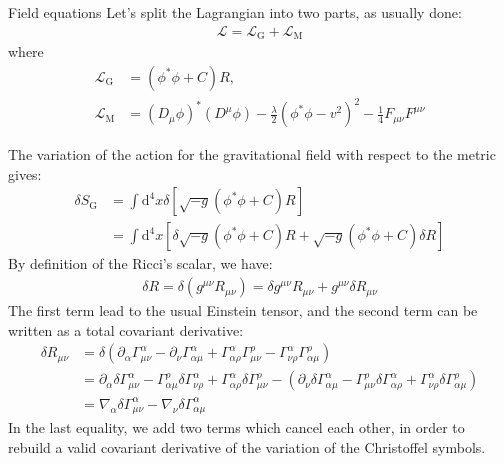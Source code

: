 \begin{subsection}{Field equations}
  Let's split the Lagrangian into two parts, as usually done:
  \begin{align}
    \mathcal{L} = \mathcal{L}_\text{G}+\mathcal{L}_\text{M}
    \end{align}
  where
  \begin{align}
    \mathcal{L}_\text{G} &= \left(\phi^*\phi+C\right)R,\\
    \mathcal{L}_\text{M} &= (D_\mu\phi)^*(D^\mu\phi)-\frac{\lambda}{2}(\phi^*\phi-v^2)^2 -\frac{1}{4}F_{\mu\nu}F^{\mu\nu}  
  \end{align}
  
  The variation of the action for the gravitational field with respect
  to the metric gives:
  \begin{align}
    \delta S_\text{G} &= \int\mathrm{d}^4x\delta\left[\sqrt{-g}(\phi^*\phi+C)R\right]\\
    &= \int\mathrm{d}^4x\left[\delta\sqrt{-g}(\phi^*\phi+C) R + \sqrt{-g}(\phi^*\phi+C)\delta R\right]
  \end{align}
  By definition of the Ricci's scalar, we have:
  \begin{align}
    \delta R = \delta\left(g^{\mu\nu}R_{\mu\nu}\right) = \delta g^{\mu\nu}R_{\mu\nu}+g^{\mu\nu}\delta R_{\mu\nu}
  \end{align}
  The first term lead to the usual Einstein tensor, and the second
  term can be written as a total covariant derivative:
  \begin{align}
    \delta R_{\mu\nu} &= \delta \left(\partial_{\alpha}\Gamma_{\mu\nu}^{\alpha}-\partial_{\nu}\Gamma_{\alpha\mu}^{\alpha}+\Gamma_{\alpha\rho}^{\alpha}\Gamma_{\mu\nu}^{\rho}-\Gamma_{\nu\rho}^{\alpha}\Gamma_{\alpha\mu}^{\rho}\right)\\
    &= \partial_{\alpha}\delta \Gamma_{\mu\nu}^{\alpha} -\Gamma_{\alpha\mu}^{\rho}\delta\Gamma_{\nu\rho}^{\alpha}+\Gamma_{\alpha\rho}^{\alpha}\delta\Gamma_{\mu\nu}^{\rho} - \left(\partial_{\nu}\delta \Gamma_{\alpha\mu}^{\alpha}-\Gamma_{\mu\nu}^{\rho}\delta\Gamma_{\alpha\rho}^{\alpha}+\Gamma_{\nu\rho}^{\alpha}\delta\Gamma_{\alpha\mu}^{\rho}\right)\\
    &=\nabla_\alpha\delta\Gamma_{\mu\nu}^{\alpha}-\nabla_\nu\delta\Gamma_{\alpha\mu}^{\alpha}
  \end{align}
  In the last equality, we add two terms which cancel each other, in
  order to rebuild a valid covariant derivative of the variation of
  the Christoffel symbols.


\end{subsection}

